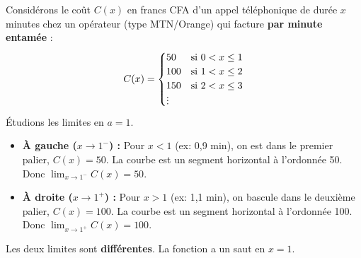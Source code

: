 \documentclass[11pt]{article}
\newcommand{\cle}[1]{{\popxbold\color{popdark}#1}}
\def\vdots{\mathord{\vbox{\baselineskip3.2pt\lineskiplimit0pt\kern4pt\hbox{.}\hbox{.}\hbox{.}}}}%
\begin{document}
\begin{exemplebox}
Considérons le coût $C(x)$ en francs CFA d'un appel téléphonique de durée $x$ minutes chez un opérateur (type MTN/Orange) qui facture \textbf{par minute entamée} :
\[ C(x) = \begin{cases} 50 & \text{si } 0 < x \le 1 \\ 100 & \text{si } 1 < x \le 2 \\ 150 & \text{si } 2 < x \le 3 \\ \vdots \end{cases} \]
Étudions les limites en $a = 1$.
\begin{itemize}
    \item \textbf{À gauche ($x \to 1^{-}$) :} Pour $x < 1$ (ex: 0,9 min), on est dans le premier palier, $C(x) = 50$. La courbe est un segment horizontal à l'ordonnée 50. Donc $\lim_{x \to 1^{-}} C(x) = 50$.
    \item \textbf{À droite ($x \to 1^{+}$) :} Pour $x > 1$ (ex: 1,1 min), on bascule dans le deuxième palier, $C(x) = 100$. La courbe est un segment horizontal à l'ordonnée 100. Donc $\lim_{x \to 1^{+}} C(x) = 100$.
\end{itemize}
Les deux limites sont \textbf{différentes}. La fonction a un \cle{saut} en $x=1$.
\end{exemplebox}
\end{document}
